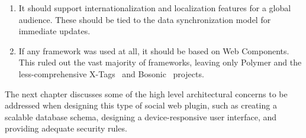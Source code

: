 \begin{enumerate}
\item It should support 
internationalization and 
localization features for a global audience. These should be tied to the data synchronization model for immediate updates.\label{motive:i18n}

\item If any framework was used at all, it should be based on Web Components.\label{motive:webcomponents} This ruled out the vast majority of frameworks, 
leaving only Polymer and the less-comp\-rehen\-sive X-Tags~\cite{x-tagscontributors2015} and Bosonic~\cite{bosoniccontributors2014} projects.
\end{enumerate}
The next chapter discusses some of the high level architectural concerns to be addressed when designing this type of social web plugin, such as creating a scalable data\-base schema, designing a device-responsive user interface, and providing adequate security rules.